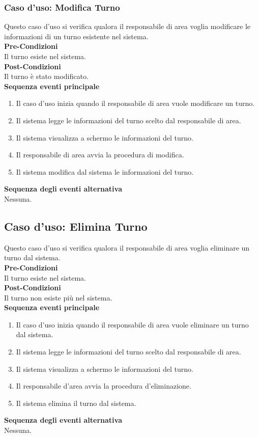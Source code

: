\documentclass[green, fancy, 11pt]{elegantbook}
\begin{document}
\subsubsection{Caso d’uso: Modifica Turno}

Questo caso d’uso si verifica qualora il responsabile di area voglia modificare le informazioni di un turno esistente nel sistema.\\
\textbf{Pre-Condizioni}\\
Il turno esiste nel sistema.\\
\textbf{Post-Condizioni}\\
Il turno è stato modificato.\\
\textbf{Sequenza eventi principale}\\
\begin{enumerate}
    \item Il caso d’uso inizia quando il responsabile di area vuole modificare un turno.
	\item Il sistema legge le informazioni del turno scelto dal responsabile di area.
	\item Il sistema visualizza a schermo le informazioni del turno.
	\item Il responsabile di area avvia la procedura di modifica.
	\item Il sistema modifica dal sistema le informazioni del turno.
\end{enumerate}
\textbf{Sequenza degli eventi alternativa}\\
Nessuna.

\subsection{Caso d'uso: Elimina Turno}

Questo caso d’uso si verifica qualora il responsabile di area voglia eliminare un turno dal sistema.\\
\textbf{Pre-Condizioni}\\
Il turno esiste nel sistema.\\
\textbf{Post-Condizioni}\\
Il turno non esiste più nel sistema.\\
\textbf{Sequenza eventi principale}
\begin{enumerate}
	\item Il caso d’uso inizia quando il responsabile di area vuole eliminare un turno dal sistema.
	\item Il sistema legge le informazioni del turno scelto dal responsabile di area.
	\item Il sistema visualizza a schermo le informazioni del turno.
	\item Il responsabile d’area avvia la procedura d’eliminazione.
	\item Il sistema elimina il turno dal sistema.
\end{enumerate}
\textbf{Sequenza degli eventi alternativa}\\
Nessuna.
\newpage
\end{document}

